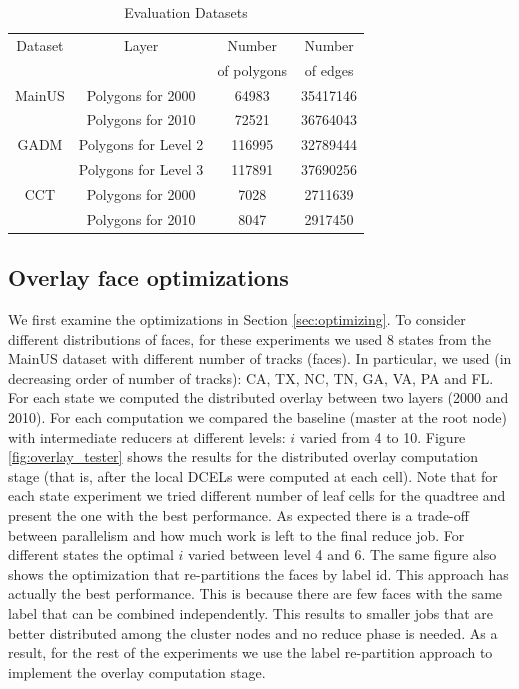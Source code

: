 \begin{table}
    \centering
    \ssp
    \small
    \caption{Evaluation Datasets}
    \label{tab:datasets}
    \begin{tabular}{c c c c}
        \toprule
        Dataset & Layer & Number        & Number    \\
                &       & of polygons   & of edges  \\
        \midrule
        MainUS& Polygons for 2000 & 64983 & 35417146        \\
              & Polygons for 2010 & 72521 & 36764043        \\
        GADM  & Polygons for Level 2 & 116995 & 32789444    \\
              & Polygons for Level 3 & 117891 & 37690256    \\
        CCT   & Polygons for 2000 & 7028 & 2711639          \\
              & Polygons for 2010 & 8047 & 2917450          \\
        \bottomrule
    \end{tabular}
\end{table}

\subsection{Overlay face optimizations}
We first examine the optimizations in Section \ref{sec:optimizing}. To consider different distributions of faces, for these experiments we used 8 states from the MainUS dataset with different number of tracks (faces). In particular, we used (in decreasing order of number of tracks): CA, TX, NC, TN, GA, VA, PA and FL. For each state we computed the distributed overlay between two layers (2000 and 2010). For each computation we compared the baseline (master at the root node) with intermediate reducers at different levels: $i$ varied from 4 to 10. 
Figure \ref{fig:overlay_tester} shows the results for the distributed overlay computation stage (that is, after the local DCELs were computed at each cell). Note that for each state experiment we tried different number of leaf cells for the quadtree and present the one with the best performance. 
As expected there is a trade-off between parallelism and how much work is left to the final reduce job. For different states the optimal $i$ varied between level 4 and 6.
The same figure also shows the optimization that re-partitions the faces by label id. This approach has actually the best performance. This is because there are few faces with the same label that can be combined independently. This results to smaller jobs that are better distributed among the cluster nodes and no reduce phase is needed. 
As a result, for the rest of the experiments we use the label re-partition approach to implement the overlay computation stage.

